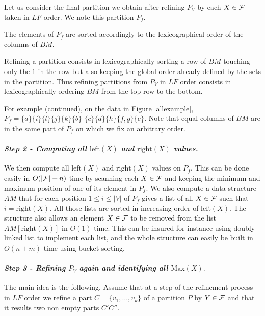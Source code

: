 \documentclass{llncs}
\begin{document}
Let us consider the final partition we obtain after refining $P_V$ by
each $X \in {\cal F}$ taken in $LF$ order. We note this partition
$P_f$.

\begin{lemma}
The elements of $P_f$ are sorted accordingly to the lexicographical order
of the columns of $BM.$
\label{lexico}
\end{lemma}
\begin{preuve}
Refining a partition consists in lexicographically sorting a row of
$BM$ touching only the $1$ in the row but also keeping the global
order already defined by the sets in the partition. Thus refining
partitions from $P_V$ in $LF$ order consists in lexicographically
ordering $BM$ from the top row to the bottom.
\end{preuve}

\noindent
For example (continued), on the data in Figure \ref{allexample},
  $P_f=\{a\}\{i\}\{l\}\{j\}\{k\}$$\{b\}$ $\{c\}$$\{d\}\{h\}\{f,g\}\{e\}.$
  Note that equal columns of $BM$ are in the same part of $P_f$ on
  which we fix an arbitrary order.


\paragraph{\bf \em Step 2 \-- Computing all $\mbox{left}(X)$ and $\mbox{right}(X)$ values.}

We then compute all $\mbox{left}(X)$ and $\mbox{right}(X)$ values on
$P_f.$ This can be done easily in $O(|{\cal F}|+n)$ time by scanning each
$X \in {\cal F}$ and keeping the minimum and maximum position of one
of its element in $P_f$. We also compute a data structure $AM$ that
for each position $1 \leq i \leq |V|$ of $P_f$ gives a list of all $X
\in {\cal F}$ such that $i=\mbox{right}(X)$. All those lists are sorted in
increasing order of $\mbox{left}(X).$ The structure also allows an
element $X \in {\cal F}$ to be removed from the list
$AM[\mbox{right}(X)]$ in $O(1)$ time. This can be insured for instance
using doubly linked list to implement each list, and the whole
structure can easily be built in $O(n+m)$ time using bucket sorting.


\paragraph{\bf \em Step 3 \-- Refining $P_V$ again and identifying all $\mbox{Max}(X).$}

The main idea is the following. Assume that at a step of the
refinement process in $LF$ order we refine a part $C=\{v_1,\ldots,
v_k\}$ of a partition $P$ by $Y\in {\cal F}$ and that it results two
non empty parts $C'C''.$ 
\end{document}
